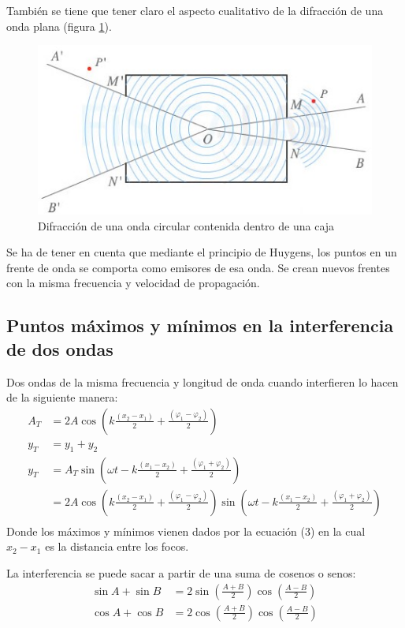 \documentclass[arial,a4paper,print]{article}
\begin{document}
También se tiene que tener claro el aspecto cualitativo de la difracción de una onda plana (figura \ref{fig:difraccion-ondas}). 
\begin{figure}[h]
	\centering
	\includegraphics[width=0.5\linewidth]{difraccion-ondas}
	\caption{Difracción de una onda circular contenida dentro de una caja}
	\label{fig:difraccion-ondas}
\end{figure}

Se ha de tener en cuenta que mediante el principio de Huygens, los puntos en un frente de onda se comporta como emisores de esa onda. Se crean nuevos frentes con la misma frecuencia y velocidad de propagación. 


\subsection{Puntos máximos y mínimos en la interferencia de dos ondas}
Dos ondas de la misma frecuencia y longitud de onda cuando interfieren lo hacen de la siguiente manera:
\begin{align}
	A_{T} &= 2A\cos\left(k\frac{(x_{2}- x_{1})}{2} + \frac{(\varphi_1-\varphi_{2})}{2}\right) \\
	y_{T} &= y_1 + y_{2} \\
	y_{T} &= A_{T}\sin\left(\omega t - k\frac{(x_{1}-x_{2})}{2} + \frac{(\varphi_1+\varphi_2)}{2}\right) \\
	&= 2A\cos\left(k\frac{(x_{2}- x_{1})}{2} + \frac{(\varphi_1-\varphi_{2})}{2}\right)\sin\left(\omega t - k\frac{(x_{1}-x_{2})}{2} + \frac{(\varphi_1+\varphi_2)}{2}\right)\\
\end{align}
Donde los máximos y mínimos vienen dados por la ecuación (3) en la cual $x_{2} - x_{1}$ es la distancia entre los focos.

La interferencia se puede sacar a partir de una suma de cosenos o senos:
\begin{align*}
	\sin A + \sin B &= 2\sin\left(\frac{A+B}{2}\right)\cos\left(\frac{A-B}{2}\right) \\
	\cos A + \cos B &= 2\cos\left(\frac{A+B}{2}\right)\cos\left(\frac{A-B}{2}\right)
\end{align*}
\end{document}
